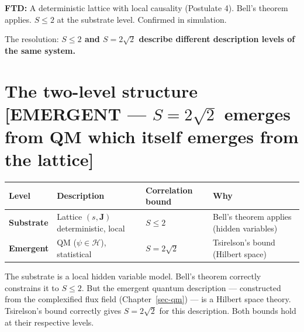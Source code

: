 \documentclass[
  11pt,
  letterpaper,
  twoside,
  openany]{book}
\makeatletter
\let\orig@section\section
\renewcommand{\section}{\needspace{8\baselineskip}\orig@section}
\makeatother
\begin{document}
\textbf{FTD:} A deterministic lattice with local causality (Postulate
4). Bell's theorem applies. \(S \leq 2\) at the substrate level.
Confirmed in simulation.

The resolution: \textbf{\(S \leq 2\) and \(S = 2\sqrt{2}\) describe
different description levels of the same system.}

\section{\texorpdfstring{The two-level structure {[}EMERGENT ---
\(S = 2\sqrt{2}\) emerges from QM which itself emerges from the
lattice{]}}{The two-level structure {[}EMERGENT --- S = 2\textbackslash sqrt\{2\} emerges from QM which itself emerges from the lattice{]}}}\label{the-two-level-structure-emergent-s-2sqrt2-emerges-from-qm-which-itself-emerges-from-the-lattice}

\begin{longtable}[]{@{}
  >{\raggedright\arraybackslash}p{}
  >{\raggedright\arraybackslash}p{}
  >{\raggedright\arraybackslash}p{}
  >{\raggedright\arraybackslash}p{}@{}}
\toprule\noalign{}
\begin{minipage}[b]{\linewidth}\raggedright
Level
\end{minipage} & \begin{minipage}[b]{\linewidth}\raggedright
Description
\end{minipage} & \begin{minipage}[b]{\linewidth}\raggedright
Correlation bound
\end{minipage} & \begin{minipage}[b]{\linewidth}\raggedright
Why
\end{minipage} \\
\midrule\noalign{}
\endhead
\bottomrule\noalign{}
\endlastfoot
\textbf{Substrate} & Lattice \((s, \mathbf{J})\) deterministic, local &
\(S \leq 2\) & Bell's theorem applies (hidden variables) \\
\textbf{Emergent} & QM (\(\psi \in \mathcal{H}\)), statistical &
\(S = 2\sqrt{2}\) & Tsirelson's bound (Hilbert space) \\
\end{longtable}

The substrate is a local hidden variable model. Bell's theorem correctly
constrains it to \(S \leq 2\). But the emergent quantum description ---
constructed from the complexified flux field (Chapter~\ref{sec-qm}) ---
is a Hilbert space theory. Tsirelson's bound correctly gives
\(S = 2\sqrt{2}\) for this description. Both bounds hold at their
respective levels.
\end{document}
